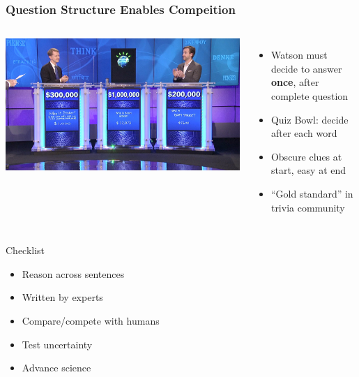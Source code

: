 \documentclass[xcolor=dvipsnames]{beamer}
\begin{document}
\begin{frame}
	\frametitle{Question Structure Enables Compeition}

	\begin{columns}

		\includegraphics[width=1.0\linewidth]{qb/jeopardy}


		\begin{itemize}
                        \item Watson must decide to answer {\bf once}, after
                          complete question
                        \item Quiz Bowl: decide after each word
                        \item Obscure clues at start, easy at end
                        \item ``Gold standard'' in trivia community
		\end{itemize}

	\end{columns}

\end{frame}

\begin{frame}{Checklist}

\begin{itemize}
  \item Reason across sentences
  \item Written by experts
  \item Compare/compete with humans\only<4->{: by design}
  \item Test uncertainty
  \item \alert<6>{Advance science} 
\end{itemize}

\end{frame}
\end{document}

